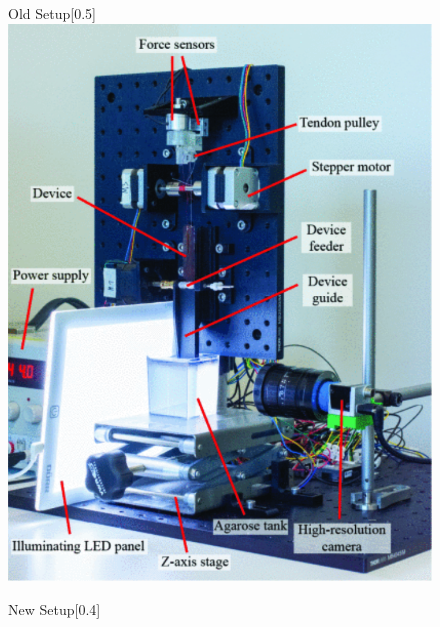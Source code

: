 \begin{figure}[H]
    \centering
    \begin{subcaptionbox}{Old Setup\label{fig:left}}[0.5\linewidth]
        {\includegraphics[width=\linewidth]{images/Hardware/old.PNG}}
    \end{subcaptionbox}
    \hspace{0.05\linewidth}
    \begin{subcaptionbox}{New Setup\label{fig:right}}[0.4\linewidth]

\end{subcaptionbox}
\end{figure}
